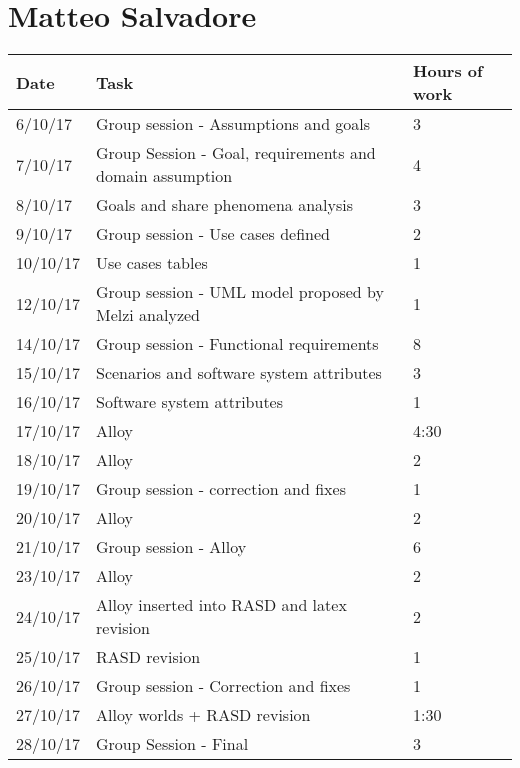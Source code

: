 \section{Matteo Salvadore}
\begin{table}[H]
	\begin{tabular}{ p{2cm} p{8cm} p{3cm}}
	Date & Task & Hours of work\\
	\hline
	6/10/17  & Group session - Assumptions and goals & 3 \\
	7/10/17  & Group Session - Goal, requirements and domain assumption & 4 \\
	8/10/17  & Goals and share phenomena analysis  & 3 \\
	9/10/17  & Group session - Use cases defined & 2 \\
	10/10/17  & Use cases tables & 1 \\
	12/10/17  & Group session - UML model proposed by Melzi analyzed & 1 \\
	14/10/17  & Group session - Functional requirements & 8 \\
	15/10/17  & Scenarios and software system attributes & 3 \\
	16/10/17  & Software system attributes & 1 \\
	17/10/17  & Alloy & 4:30  \\
	18/10/17  & Alloy & 2 \\
	19/10/17  & Group session - correction and fixes & 1 \\
	20/10/17   & Alloy & 2 \\
	21/10/17  & Group session - Alloy & 6 \\
	23/10/17  & Alloy & 2 \\
	24/10/17  & Alloy inserted into RASD and latex revision & 2 \\
	25/10/17  & RASD revision & 1 \\
	26/10/17  & Group session - Correction and fixes & 1 \\
	27/10/17  & Alloy worlds + RASD revision & 1:30 \\
	28/10/17  & Group Session - Final  & 3 \\
	
	
	\end{tabular}
\end{table}